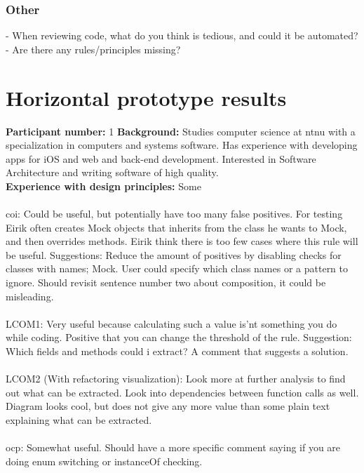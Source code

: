 \subsubsection*{Other} 
- When reviewing code, what do you think is tedious, and could it be automated?
- Are there any rules/principles missing?

\clearpage
\section{Horizontal prototype results}
\textbf{Participant number:} 1 \newline
\textbf{Background:} Studies computer science at \gls{ntnu} with a specialization in computers and systems software. Has experience with developing apps for iOS and web and back-end development. Interested in Software Architecture and writing software of high quality. \\
\textbf{Experience with design principles:} Some \\\\

\noindent \gls{coi}: Could be useful, but potentially have too many false positives. For testing Eirik often creates Mock objects that inherits from the class he wants to Mock, and then overrides methods. Eirik think there is too few cases where this rule will be useful. Suggestions: Reduce the amount of positives by disabling checks for classes with names; Mock. User could specify which class names or a pattern to ignore. Should revisit sentence number two about composition, it could be misleading.\\\\

\noindent LCOM1: Very useful because calculating such a value is'nt something you do while coding. Positive that you can change the threshold of the rule. Suggestion: Which fields and methods could i extract? A comment that suggests a solution. \\\\

\noindent LCOM2 (With refactoring visualization): Look more at further analysis to find out what can be extracted. Look into dependencies between function calls as well. Diagram looks cool, but does not give any more value than some plain text explaining what can be extracted. \\\\

\noindent \gls{ocp}: Somewhat useful. Should have a more specific comment saying if you are doing enum switching or instanceOf checking. \\\\

